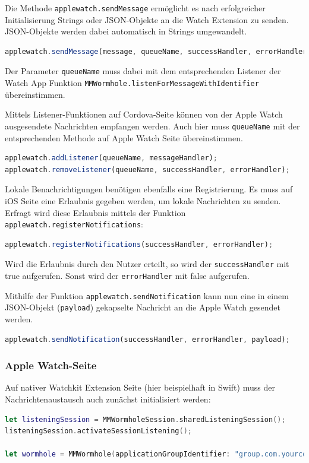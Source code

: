 Die Methode \texttt{applewatch.sendMessage} ermöglicht es nach erfolgreicher Initialisierung Strings oder JSON-Objekte an die Watch Extension zu senden. JSON-Objekte werden dabei automatisch in Strings umgewandelt.
\begin{lstlisting}[language=JavaScript]
applewatch.sendMessage(message, queueName, successHandler, errorHandler);
\end{lstlisting}
Der Parameter \texttt{queueName} muss dabei mit dem entsprechenden Listener der Watch App Funktion \texttt{MMWormhole.listenForMessageWithIdentifier} übereinstimmen. 

Mittels Listener-Funktionen auf Cordova-Seite können von der Apple Watch ausgesendete Nachrichten empfangen werden. Auch hier muss \texttt{queueName} mit der entsprechenden Methode auf Apple Watch Seite übereinstimmen.
\begin{lstlisting}[language=JavaScript]
applewatch.addListener(queueName, messageHandler);
applewatch.removeListener(queueName, successHandler, errorHandler);
\end{lstlisting}

Lokale Benachrichtigungen benötigen ebenfalls eine Registrierung. Es muss auf iOS Seite eine Erlaubnis gegeben werden, um lokale Nachrichten zu senden. Erfragt wird diese Erlaubnis mittels der Funktion \texttt{applewatch.registerNotifications}:
\begin{lstlisting}[language=JavaScript]
applewatch.registerNotifications(successHandler, errorHandler);
\end{lstlisting}
Wird die Erlaubnis durch den Nutzer erteilt, so wird der \texttt{successHandler} mit true aufgerufen. Sonst wird der \texttt{errorHandler} mit false aufgerufen.

Mithilfe der Funktion \texttt{applewatch.sendNotification} kann nun eine in einem JSON-Objekt (\texttt{payload}) gekapselte Nachricht an die Apple Watch gesendet werden.  
\begin{lstlisting}[language=JavaScript]
applewatch.sendNotification(successHandler, errorHandler, payload);
\end{lstlisting}
%
%
\subsubsection{Apple Watch-Seite}
Auf nativer Watchkit Extension Seite (hier beispielhaft in Swift) muss der Nachrichtenaustausch auch zunächst initialisiert werden:
\begin{lstlisting}[language=swift, breaklines=true]
let listeningSession = MMWormholeSession.sharedListeningSession();
listeningSession.activateSessionListening();

let wormhole = MMWormhole(applicationGroupIdentifier: "group.com.yourcompany", optionalDirectory: nil, transitingType: .SessionContext);
\end{lstlisting}

